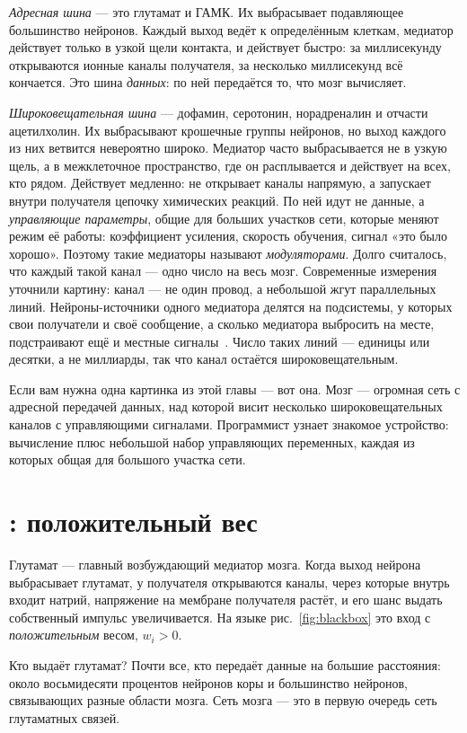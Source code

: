 \emph{Адресная шина} --- это глутамат и ГАМК. Их выбрасывает подавляющее большинство нейронов. Каждый выход ведёт к определённым клеткам, медиатор действует только в узкой щели контакта, и действует быстро: за миллисекунду открываются ионные каналы получателя, за несколько миллисекунд всё кончается. Это шина \emph{данных}: по ней передаётся то, что мозг вычисляет.

\emph{Широковещательная шина} --- дофамин, серотонин, норадреналин и отчасти ацетилхолин. Их выбрасывают крошечные группы нейронов, но выход каждого из них ветвится невероятно широко. Медиатор часто выбрасывается не в узкую щель, а в межклеточное пространство, где он расплывается и действует на всех, кто рядом. Действует медленно: не открывает каналы напрямую, а запускает внутри получателя цепочку химических реакций. По ней идут не данные, а \emph{управляющие параметры}, общие для больших участков сети, которые меняют режим её работы: коэффициент усиления, скорость обучения, сигнал «это было хорошо». Поэтому такие медиаторы называют \emph{модуляторами}. Долго считалось, что каждый такой канал --- одно число на весь мозг. Современные измерения уточнили картину: канал --- не один провод, а небольшой жгут параллельных линий. Нейроны-источники одного медиатора делятся на подсистемы, у которых свои получатели и своё сообщение, а сколько медиатора выбросить на месте, подстраивают ещё и местные сигналы~\cite{Ren2018,Poe2020}. Число таких линий --- единицы или десятки, а не миллиарды, так что канал остаётся широковещательным.

Если вам нужна одна картинка из этой главы --- вот она. Мозг --- огромная сеть с адресной передачей данных, над которой висит несколько широковещательных каналов с управляющими сигналами. Программист узнает знакомое устройство: вычисление плюс небольшой набор управляющих переменных, каждая из которых общая для большого участка сети.

\section{: положительный вес}

Глутамат --- главный возбуждающий медиатор мозга. Когда выход нейрона выбрасывает глутамат, у получателя открываются каналы, через которые внутрь входит натрий, напряжение на мембране получателя растёт, и его шанс выдать собственный импульс увеличивается. На языке рис.~\ref{fig:blackbox} это вход с \emph{положительным} весом, $w_i>0$.

Кто выдаёт глутамат? Почти все, кто передаёт данные на большие расстояния: около восьмидесяти процентов нейронов коры и большинство нейронов, связывающих разные области мозга. Сеть мозга --- это в первую очередь сеть глутаматных связей.

